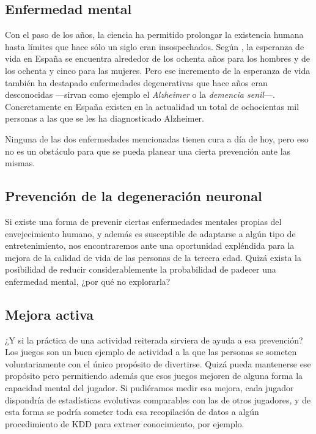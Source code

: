 \subsection{Enfermedad mental}

Con el paso de los años, la ciencia ha permitido prolongar la existencia humana hasta límites que hace sólo un siglo eran insospechados. Según \cite{ine-esperanza}, la esperanza de vida en España se encuentra alrededor de los ochenta años para los hombres y de los ochenta y cinco para las mujeres. Pero ese incremento de la esperanza de vida también ha destapado enfermedades degenerativas que hace años eran desconocidas ---sirvan como ejemplo el {\it Alzheimer} o la {\it demencia senil}---. Concretamente en España existen en la actualidad un total de ochocientas mil personas a las que se les ha diagnosticado Alzheimer.

Ninguna de las dos enfermedades mencionadas tienen cura a día de hoy, pero eso no es un obstáculo para que se pueda planear una cierta prevención ante las mismas.

\subsection{Prevención de la degeneración neuronal}

Si existe una forma de prevenir ciertas enfermedades mentales propias del envejecimiento humano, y además es susceptible de adaptarse a algún tipo de entretenimiento, nos encontraremos ante una oportunidad expléndida para la mejora de la calidad de vida de las personas de la tercera edad. Quizá exista la posibilidad de reducir considerablemente la probabilidad de padecer una enfermedad mental, ¿por qué no explorarla?

\subsection{Mejora activa}

¿Y si la práctica de una actividad reiterada sirviera de ayuda a esa prevención? Los juegos son un buen ejemplo de actividad a la que las personas se someten voluntariamente con el único propósito de divertirse. Quizá pueda mantenerse ese propósito pero permitiendo además que esos juegos mejoren de alguna forma la capacidad mental del jugador. Si pudiéramos medir esa mejora, cada jugador dispondría de estadísticas evolutivas comparables con las de otros jugadores, y de esta forma se podría someter toda esa recopilación de datos a algún procedimiento de \acf{KDD} para extraer conocimiento, por ejemplo.


